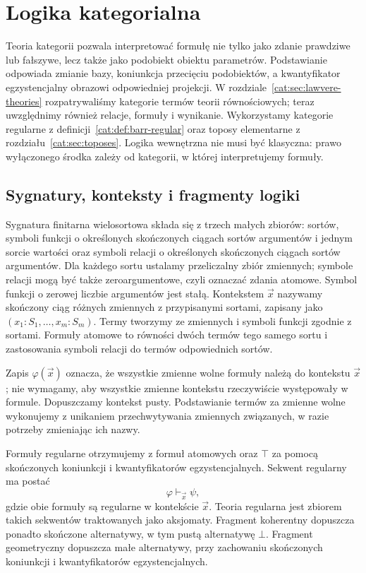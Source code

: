 \section{Logika kategorialna}\label{cat:sec:categorical-logic}

Teoria kategorii pozwala interpretować formułę nie tylko jako zdanie prawdziwe lub fałszywe, lecz także jako podobiekt obiektu parametrów. Podstawianie odpowiada zmianie bazy, koniunkcja przecięciu podobiektów, a kwantyfikator egzystencjalny obrazowi odpowiedniej projekcji. W rozdziale~\ref{cat:sec:lawvere-theories} rozpatrywaliśmy kategorie termów teorii równościowych; teraz uwzględnimy również relacje, formuły i wynikanie. Wykorzystamy kategorie regularne z definicji~\ref{cat:def:barr-regular} oraz toposy elementarne z rozdziału~\ref{cat:sec:toposes}. Logika wewnętrzna nie musi być klasyczna: prawo wyłączonego środka zależy od kategorii, w której interpretujemy formuły.

\subsection{Sygnatury, konteksty i fragmenty logiki}

\begin{definicja}\label{cat:def:cl-signature}
Sygnatura finitarna wielosortowa składa się z trzech małych zbiorów: sortów, symboli funkcji o określonych skończonych ciągach sortów argumentów i jednym sorcie wartości oraz symboli relacji o określonych skończonych ciągach sortów argumentów. Dla każdego sortu ustalamy przeliczalny zbiór zmiennych; symbole relacji mogą być także zeroargumentowe, czyli oznaczać zdania atomowe. Symbol funkcji o zerowej liczbie argumentów jest stałą. Kontekstem $\vec x$ nazywamy skończony ciąg różnych zmiennych z przypisanymi sortami, zapisany jako $(x_1:S_1,\ldots,x_m:S_m)$. Termy tworzymy ze zmiennych i symboli funkcji zgodnie z sortami. Formuły atomowe to równości dwóch termów tego samego sortu i zastosowania symboli relacji do termów odpowiednich sortów.
\end{definicja}

Zapis $\varphi(\vec x)$ oznacza, że wszystkie zmienne wolne formuły należą do kontekstu $\vec x$; nie wymagamy, aby wszystkie zmienne kontekstu rzeczywiście występowały w formule. Dopuszczamy kontekst pusty. Podstawianie termów za zmienne wolne wykonujemy z unikaniem przechwytywania zmiennych związanych, w razie potrzeby zmieniając ich nazwy.

\begin{definicja}\label{cat:def:cl-regular-formulas}
Formuły regularne otrzymujemy z formuł atomowych oraz $\top$ za pomocą skończonych koniunkcji i kwantyfikatorów egzystencjalnych. Sekwent regularny ma postać
\[
 \varphi\vdash_{\vec x}\psi,
\]
gdzie obie formuły są regularne w kontekście $\vec x$. Teoria regularna jest zbiorem takich sekwentów traktowanych jako aksjomaty. Fragment koherentny dopuszcza ponadto skończone alternatywy, w tym pustą alternatywę $\bot$. Fragment geometryczny dopuszcza małe alternatywy, przy zachowaniu skończonych koniunkcji i kwantyfikatorów egzystencjalnych.
\end{definicja}

